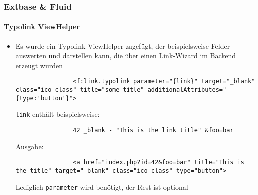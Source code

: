 \begin{frame}[fragile]
	\frametitle{Extbase \& Fluid}
	\framesubtitle{Typolink ViewHelper}

	\lstset{
		basicstyle=\tiny\ttfamily
	}

	\begin{itemize}
		\item Es wurde ein Typolink-ViewHelper zugefügt, der beispielsweise Felder
			auswerten und darstellen kann, die über einen Link-Wizard im Backend
			erzeugt wurden

			\begin{lstlisting}
				<f:link.typolink parameter="{link}" target="_blank" class="ico-class" title="some title" additionalAttributes="{type:'button'}">
			\end{lstlisting}

			\texttt{link} enthält beispielsweise:
			\begin{lstlisting}
				42 _blank - "This is the link title" &foo=bar
			\end{lstlisting}

			Ausgabe:
			\begin{lstlisting}
				<a href="index.php?id=42&foo=bar" title="This is the title" target="_blank" class="ico-class" type="button">
			\end{lstlisting}

			Lediglich \texttt{parameter} wird benötigt, der Rest ist optional

	\end{itemize}

\end{frame}


